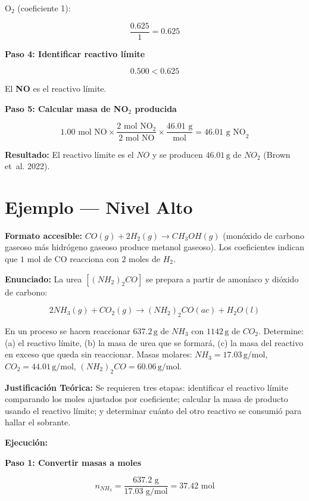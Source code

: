 \documentclass[
  spanish,
  letterpaper,
  12pt,
  oneside,
  open=any]{scrbook}
\newcommand{\setcolorsection}[2]{%
  \definecolor{currentsectionbg}{HTML}{#1}%
  \definecolor{currentsectionborder}{HTML}{#2}%
}
\begin{document}
O\(_2\) (coeficiente 1):

\[\frac{0.625}{1} = 0.625\]

\textbf{Paso 4: Identificar reactivo límite}

\[0.500 < 0.625\]

El \textbf{NO} es el reactivo límite.

\textbf{Paso 5: Calcular masa de NO\(_2\) producida}

\[1.00 \text{ mol NO} \times \frac{2 \text{ mol NO}_2}{2 \text{ mol NO}} \times \frac{46.01 \text{ g}}{\text{mol}} = 46.01 \text{ g NO}_2\]

\textbf{Resultado:} El reactivo límite es el \(NO\) y se producen
\(46.01\,\text{g}\) de \(NO_2\) (Brown et~al. 2022).

\setcolorsection{b3d9f0}{94c4e0}

\section{Ejemplo --- Nivel Alto}\label{ejemplo-nivel-alto}

\textbf{Formato accesible:} \(CO(g) + 2H_2(g) \rightarrow CH_3OH(g)\)
(monóxido de carbono gaseoso más hidrógeno gaseoso produce metanol
gaseoso). Los coeficientes indican que \(1\) mol de CO reacciona con
\(2\) moles de \(H_2\).

\textbf{Enunciado:} La urea \([(NH_2)_2CO]\) se prepara a partir de
amoníaco y dióxido de carbono:

\[2NH_3(g) + CO_2(g) \rightarrow (NH_2)_2CO(ac) + H_2O(l)\]

En un proceso se hacen reaccionar \(637.2\,\text{g}\) de \(NH_3\) con
\(1142\,\text{g}\) de \(CO_2\). Determine: (a) el reactivo límite, (b)
la masa de urea que se formará, (c) la masa del reactivo en exceso que
queda sin reaccionar. Masas molares: \(NH_3 = 17.03\,\text{g/mol}\),
\(CO_2 = 44.01\,\text{g/mol}\), \((NH_2)_2CO = 60.06\,\text{g/mol}\).

\textbf{Justificación Teórica:} Se requieren tres etapas: identificar el
reactivo límite comparando los moles ajustados por coeficiente; calcular
la masa de producto usando el reactivo límite; y determinar cuánto del
otro reactivo se consumió para hallar el sobrante.

\textbf{Ejecución:}

\textbf{Paso 1: Convertir masas a moles}

\[n_{NH_3} = \frac{637.2 \text{ g}}{17.03 \text{ g/mol}} = 37.42 \text{ mol}\]
\end{document}
